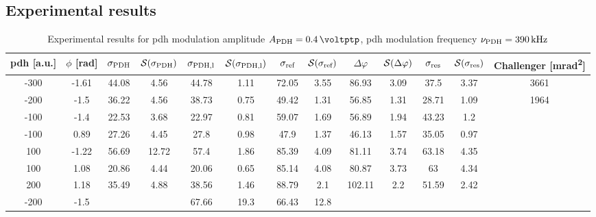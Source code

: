 \begin{landscape}
	\chapter{Experimental results}
	
	
	\begin{table}
	\centering
	\begin{tabular}{|c|c|c|c|c|c|c|c|c|c|c|c|c|}
		\hline
		\gls{pdh} [a.u.] & $\phi$ [\si{\radian}] & $\sigma_{\text{PDH}}$ & $\mathcal{S}(\sigma_{\text{PDH}})$ & $\sigma_{\text{PDH,l}}$ & $\mathcal{S}(\sigma_{\text{PDH,l}})$  & $\sigma_{\text{ref}}$ & $\mathcal{S}(\sigma_{\text{ref}})$ & $\Delta \varphi$ & $\mathcal{S}(\Delta \varphi)$ & $\sigma_{\text{res}}$  & $\mathcal{S}(\sigma_{\text{res}})$ & Challenger [\si{\milli\radian\squared}] \\
		\hline
		\hline
		-300 & -1.61 & 44.08 & 4.56 & 44.78 & 1.11 & 72.05 & 3.55 & 86.93 & 3.09 & 37.5 & 3.37 & 3661\\
		-200 & -1.5 & 36.22 & 4.56 & 38.73 & 0.75 & 49.42 & 1.31 & 56.85 & 1.31 & 28.71 & 1.09 & 1964\\
		-100 & -1.4 & 22.53 & 3.68 & 22.97 & 0.81 & 59.07 & 1.69 & 56.89 & 1.94 & 43.23 & 1.2 & \\
		-100 & 0.89 & 27.26 & 4.45 & 27.8 & 0.98 & 47.9 & 1.37 & 46.13 & 1.57 & 35.05 & 0.97 & \\
		100 & -1.22 & 56.69 & 12.72 & 57.4 & 1.86 & 85.39 & 4.09 & 81.11 & 3.74 & 63.18 & 4.35 & \\
		100 & 1.08 & 20.86 & 4.44 & 20.06 & 0.65 & 85.14 & 4.08 & 80.87 & 3.73 & 63 & 4.34 & \\
		200 & 1.18 & 35.49 & 4.88 & 38.56 & 1.46 & 88.79 & 2.1 & 102.11 & 2.2 & 51.59 & 2.42 & \\
		\hline
		\hline
		-200 & -1.5 & & & 67.66 & 19.3 & 66.43 & 12.8 & & & & & \\
		\hline
	\end{tabular}
	\caption{Experimental results for \gls{pdh} modulation amplitude $\tind{A}{PDH} = \SI{0.4}{\voltptp}$, \gls{pdh} modulation frequency $\nu_{\text{PDH}} = \SI{390}{\kilo\hertz}$}
	\end{table}
	
	

\end{landscape}

